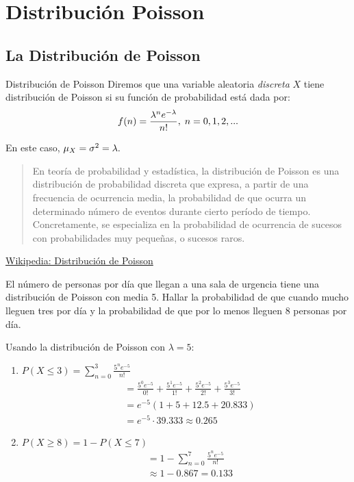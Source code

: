 \section{Distribución Poisson}
\subsection{La Distribución de Poisson}
{Distribución de Poisson} Diremos que una variable aleatoria \emph{discreta} $X$ tiene distribución de Poisson si su función de probabilidad está dada por:
 \begin{align}
  \label{eq:2.10.7}
  f(n)=\dfrac{\lambda^{n}e^{-\lambda}}{n!}, \; n=0,1,2,...
 \end{align}


En este caso, $\mu_{X}=\sigma^{2}=\lambda.$


\begin{quote}
 En teoría de probabilidad y estadística, la distribución de Poisson es una distribución de probabilidad discreta que expresa, a partir de una frecuencia de ocurrencia media, la probabilidad de que ocurra un determinado número de eventos durante cierto período de tiempo. Concretamente, se especializa en la probabilidad de ocurrencia de sucesos con probabilidades muy pequeñas, o sucesos raros.
\end{quote}

\href{https://es.wikipedia.org/wiki/Distribuci\%C3\%B3n_de_Poisson}{Wikipedia: Distribución de Poisson}


\begin{ejemplo}
  \label{exmp:2.10.5}
  El número de personas por día que llegan a una sala de urgencia tiene una distribución de Poisson con media 5. Hallar la probabilidad de que cuando mucho lleguen tres por día y la probabilidad de que por lo menos lleguen 8 personas por día.
 \end{ejemplo}

\begin{solucion}
	Usando la distribución de Poisson con $\lambda = 5$:

	\begin{enumerate}
		\item $P(X \leq 3) = \sum_{n=0}^{3} \frac{5^n e^{-5}}{n!}$
		\begin{align}
			&= \frac{5^0 e^{-5}}{0!} + \frac{5^1 e^{-5}}{1!} + \frac{5^2 e^{-5}}{2!} + \frac{5^3 e^{-5}}{3!} \\
			&= e^{-5}(1 + 5 + 12.5 + 20.833) \\
			&= e^{-5} \cdot 39.333 \approx 0.265
		\end{align}

		\item $P(X \geq 8) = 1 - P(X \leq 7)$
		\begin{align}
			&= 1 - \sum_{n=0}^{7} \frac{5^n e^{-5}}{n!} \\
			&\approx 1 - 0.867 = 0.133
		\end{align}
	\end{enumerate}
\end{solucion}





